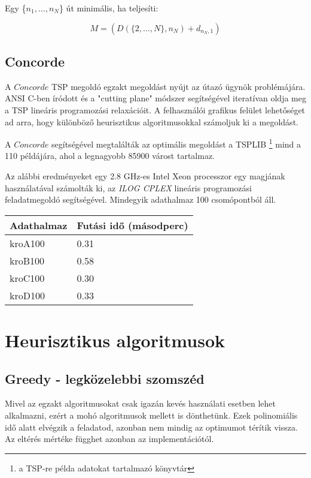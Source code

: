Egy \{\(n_1, \dots, n_N\)\} út minimális, ha teljesíti:

\begin{equation}
M = (D(\{2, \dots, N\}, n_N)+d_{n_N, 1})
\end{equation}

\subsection{Concorde}

A \(Concorde\) TSP megoldó\cite{concorde} egzakt megoldást nyújt az útazó ügynök problémájára. ANSI C-ben íródott és a "cutting plane" módszer segítségével iteratívan oldja meg a TSP lineáris programozási relaxációit. A felhasználói grafikus felület lehetőséget ad arra, hogy különböző heurisztikus algoritmusokkal számoljuk ki a megoldást. 

A \(Concorde\) segítségével megtalálták az optimális megoldást a TSPLIB%
\footnote{ %
	a TSP-re példa adatokat tartalmazó könyvtár
}  %
mind a 110 példájára, ahol a legnagyobb 85900 várost tartalmaz.

Az alábbi eredményeket egy 2.8 GHz-es Intel Xeon processzor egy magjának használatával számolták ki, az \textit{ILOG CPLEX} lineáris programozási feladatmegoldó segítségével. Mindegyik adathalmaz 100 csomópontból áll.

\begin{table}[]
	\begin{tabular}{l|l}
		\textbf{Adathalmaz} & \textbf{Futási idő} (másodperc) \\
		\hline
		kroA100         & 0.31  \\
		kroB100         & 0.58 \\
		kroC100         & 0.30 \\   
		kroD100         & 0.33        
	\end{tabular}
\end{table}

\section{Heurisztikus algoritmusok}\label{sec:ALAP:adatelem}

\subsection{Greedy - legközelebbi szomszéd}

Mivel az egzakt algoritmusokat csak igazán kevés használati esetben lehet alkalmazni, ezért a mohó algoritmusok mellett is dönthetünk. Ezek polinomiális idő alatt elvégzik a feladatod, azonban nem mindig az optimumot térítik vissza. Az eltérés mértéke függhet azonban az implementációtól.


